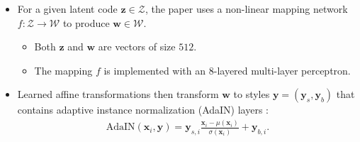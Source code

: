 \documentclass[10pt]{article}
\newcommand{\ve}[1]{\mathbf{#1}}
\begin{document}
  \begin{itemize}
  	\item For a given latent code $\ve{z} \in \mathcal{Z}$, the paper uses a non-linear mapping network $f: \mathcal{Z} \rightarrow \mathcal{W}$ to produce $\ve{w} \in \mathcal{W}$.

  	\begin{itemize}
  		\item Both $\ve{z}$ and $\ve{w}$ are vectors of size $512$.

  		\item The mapping $f$ is implemented with an $8$-layered multi-layer perceptron.
  	\end{itemize}

  	\item Learned affine transformations then transform $\ve{w}$ to styles $\ve{y} = (\ve{y}_s, \ve{y}_b)$ that contains adaptive instance normalization (AdaIN) layers \cite{Huang:2017}:
  	\begin{align*}
  		\mathrm{AdaIN}(\ve{x}_i, \ve{y})
  		= \ve{y}_{s,i} \frac{\ve{x}_i - \mu(\ve{x}_i)}{\sigma(\ve{x}_i)} + \ve{y}_{b,i}.
  	\end{align*}
  \end{itemize}

  
    
\end{document}
